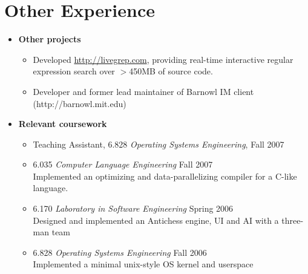 \documentclass[letterpaper,10pt]{article}
\begin{document}
\section*{Other Experience}
\vspace*{-0.2cm}
\begin{itemize}
  \item \textbf{Other projects} \\
    \vspace*{-0.5cm}
    \begin{itemize}
    \item Developed \url{http://livegrep.com}, providing real-time
      interactive regular expression search over $>$450MB of source
      code.
    \item Developer and former lead maintainer of Barnowl IM client
      (http://barnowl.mit.edu)
    \end{itemize}

  \item \textbf{Relevant coursework}
  \begin{itemize}
      \item Teaching Assistant, 6.828 {\em Operating Systems Engineering}, Fall 2007
      \item 6.035 {\em Computer Language Engineering} Fall 2007 \\
        Implemented an optimizing and data-parallelizing compiler for a
        C-like language.
      \item 6.170 {\em Laboratory in Software Engineering} Spring 2006 \\
        Designed and implemented an Antichess engine, UI and AI with a three-man team
      \item 6.828 {\em Operating Systems Engineering} Fall 2006 \\
        Implemented a minimal unix-style OS kernel and userspace
  \end{itemize}
\end{itemize}
\end{document}
